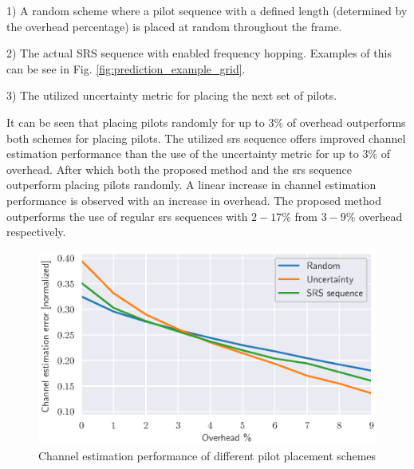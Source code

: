 1) A random scheme where a pilot sequence with a defined length (determined by the overhead percentage) is placed at random throughout the frame. 

2) The actual SRS sequence with enabled frequency hopping. Examples of this can be see in Fig. \ref{fig:prediction_example_grid}. 

3) The utilized uncertainty metric for placing the next set of pilots.

It can be seen that placing pilots randomly for up to $3\%$ of overhead outperforms both schemes for placing pilots. The utilized \gls{srs} sequence offers improved channel estimation performance than the use of the uncertainty metric for up to $3\%$ of overhead. After which both the proposed method and the \gls{srs} sequence outperform placing pilots randomly. A linear increase in channel estimation performance is observed with an increase in overhead. The proposed method outperforms the use of regular \gls{srs} sequences with $2-17\%$ from $3-9\%$ overhead respectively.

\begin{figure}
    \centering
    \includegraphics{chapters/part_uplink/figures/results/channel_estimation/overhead_comparison_scheme.eps}
    \caption{Channel estimation performance of different pilot placement schemes}
    \label{fig:overhead_channel_estimation}
\end{figure}


